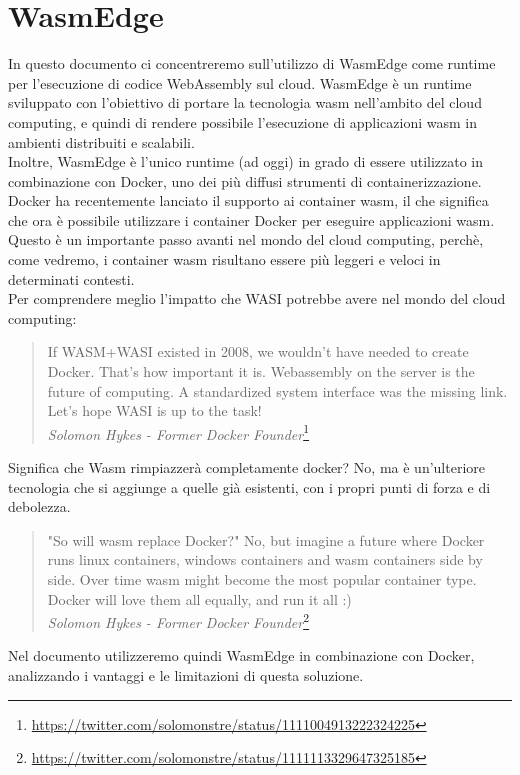 \section{WasmEdge}
In questo documento ci concentreremo sull'utilizzo di WasmEdge come runtime per l'esecuzione di codice WebAssembly sul
cloud. WasmEdge è un runtime sviluppato con l'obiettivo di portare la tecnologia wasm nell'ambito del cloud computing, e
quindi di rendere possibile l'esecuzione di applicazioni wasm in ambienti distribuiti e scalabili. \\
Inoltre, WasmEdge è l'unico runtime (ad oggi) in grado di essere utilizzato in combinazione con Docker, uno dei più
diffusi strumenti di containerizzazione. Docker ha recentemente lanciato il supporto ai container
wasm\cite{docker-wasm-tech-preview}, il che significa che ora è possibile utilizzare i container Docker per eseguire
applicazioni wasm. Questo è un importante passo avanti nel mondo del cloud computing, perchè, come vedremo, i container
wasm risultano essere più leggeri e veloci in determinati contesti. \\
Per comprendere meglio l'impatto che WASI potrebbe avere nel mondo del cloud computing:
\begin{quote}
    If WASM+WASI existed in 2008, we wouldn't have needed to create Docker. That's how important it is. Webassembly on
    the server is the future of computing. A standardized system interface was the missing link. Let's hope WASI is up
    to the task! \\
    \textit{Solomon Hykes - Former Docker
    Founder}\footnote{\url{https://twitter.com/solomonstre/status/1111004913222324225}}
\end{quote}

Significa che Wasm rimpiazzerà completamente docker? No, ma è un'ulteriore tecnologia che si aggiunge a quelle già
esistenti, con i propri punti di forza e di debolezza.
\begin{quote}
    "So will wasm replace Docker?" No, but imagine a future where Docker runs linux containers, windows containers and
    wasm containers side by side. Over time wasm might become the most popular container type. Docker will love them all
    equally, and run it all :) \\
    \textit{Solomon Hykes - Former Docker
    Founder}\footnote{\url{https://twitter.com/solomonstre/status/1111113329647325185}}
\end{quote}

Nel documento utilizzeremo quindi WasmEdge in combinazione con Docker, analizzando i vantaggi e le limitazioni di questa
soluzione.